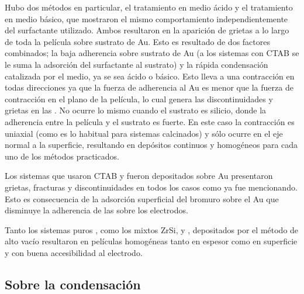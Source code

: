 			Hubo dos métodos en particular, el tratamiento en medio ácido y el tratamiento en medio básico, que mostraron el mismo comportamiento independientemente del surfactante utilizado. Ambos resultaron en la aparición de grietas a lo largo de toda la película sobre sustrato de Au. Esto es resultado de dos factores combinados; la baja adherencia sobre sustrato de Au (a los sistemas con CTAB se le suma la adsorción del surfactante al sustrato) y la rápida condensación catalizada por el medio, ya se sea ácido o básico. Esto lleva a una contracción en todas direcciones ya que la fuerza de adherencia al Au es menor que la fuerza de contracción en el plano de la película, lo cual genera las discontinuidades y grietas en las \pdm. No ocurre lo mismo cuando el sustrato es silicio, donde la adherencia entre la película y el sustrato es fuerte. En este caso la contracción es uniaxial (como es lo habitual para sistemas calcinados) y sólo ocurre en el eje normal a la superficie, resultando en depósitos continuos y homogéneos para cada uno de los métodos practicados.

			Los sistemas que usaron CTAB y fueron depositados sobre Au presentaron grietas, fracturas y discontinuidades en todos los casos como ya fue mencionando. Esto es consecuencia de la adsorción superficial del bromuro sobre el Au que disminuye la adherencia de las \pdm\space sobre los electrodos. 

			Tanto los sistemas puros \pdmF, como los mixtos Zr\textbar Si, \pdmZ\space y \pdmZB, depositados por el método de alto vacío resultaron en películas homogéneas tanto en espesor como en superficie y con buena accesibilidad al electrodo.

	\subsection{Sobre la condensación}

